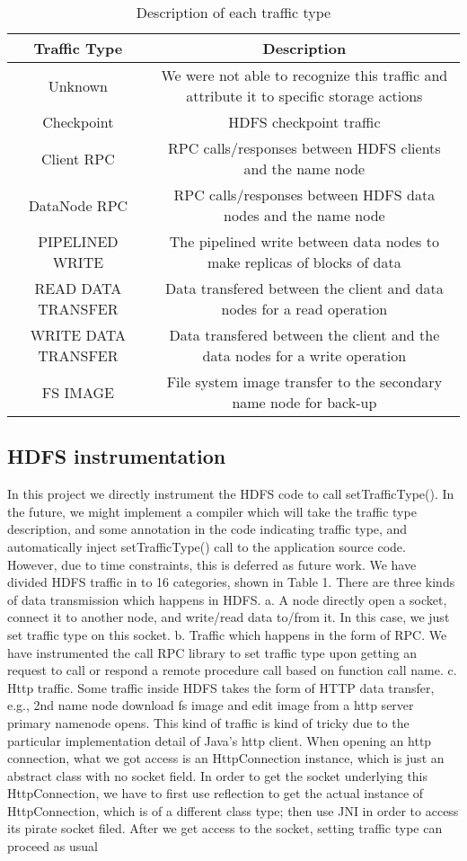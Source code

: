\begin{table*}[!htpb]
\centering
\begin{tabular}{|c|c|} \hline
Traffic Type & Description\\ \hline
Unknown & We were not able to recognize this traffic and attribute it to specific storage actions \\ \hline
Checkpoint & HDFS checkpoint traffic\\ \hline
Client RPC & RPC calls/responses between HDFS clients and the name node\\ \hline
DataNode RPC & RPC calls/responses between HDFS data nodes and the name node\\ \hline
PIPELINED WRITE & The pipelined write between data nodes to make replicas of blocks of data\\ \hline
READ DATA TRANSFER & Data transfered between the client and data nodes for a read operation\\ \hline
WRITE DATA TRANSFER & Data transfered between the client and the data nodes for a write operation \\ \hline
FS IMAGE & File system image transfer to the secondary name node for back-up \\ \hline
\end{tabular}\label{table:type}
\caption{Description of each traffic type}
\end{table*}

\subsection{HDFS instrumentation}
     In this project we directly instrument the HDFS code to call setTrafficType(). In the future, we might implement a compiler which will take the traffic type description, and some annotation in the code indicating traffic type, and automatically inject setTrafficType() call to the application source code. However, due to time constraints, this is deferred as future work. 
       We have divided HDFS traffic in to 16 categories, shown in Table 1. There are three kinds of data transmission which happens in HDFS.
     a. A node directly open a socket, connect it to another node, and write/read data to/from it. In this case, we just set traffic type on this socket. 
     b. Traffic which happens in the form of RPC. We have instrumented the call RPC library to set traffic type upon getting an request to call or respond a remote procedure call based on function call name. 
     c. Http traffic. Some traffic inside HDFS takes the form of HTTP data transfer, e.g., 2nd name node download fs image and edit image from a http server primary namenode opens. This kind of traffic is kind of tricky due to the particular implementation detail of Java's http client. When opening an http connection, what we got access is an HttpConnection instance, which is just an abstract class with no socket field. In order to get the socket underlying this HttpConnection, we have to first use reflection to get the actual instance of HttpConnection, which is of a different class type; then use JNI in order to access its pirate socket filed. After we get access to the socket, setting traffic type can proceed as usual 


